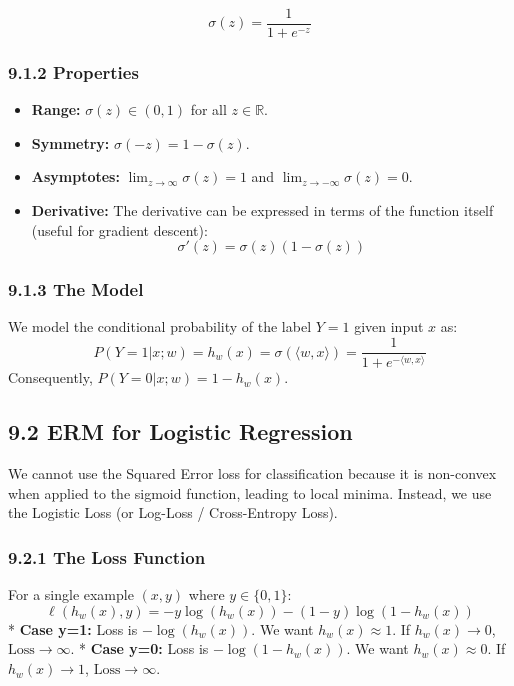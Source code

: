\documentclass[
  italian,
  11pt,
]{article}
\providecommand{\tightlist}{%
  \setlength{\itemsep}{0pt}\setlength{\parskip}{0pt}}
\begin{document}
\[\sigma(z) = \frac{1}{1 + e^{-z}}\]

\subsubsection{9.1.2 Properties}\label{properties}

\begin{itemize}
\tightlist
\item
  \textbf{Range:} \(\sigma(z) \in (0, 1)\) for all \(z \in \mathbb{R}\).
\item
  \textbf{Symmetry:} \(\sigma(-z) = 1 - \sigma(z)\).
\item
  \textbf{Asymptotes:} \(\lim_{z \to \infty} \sigma(z) = 1\) and
  \(\lim_{z \to -\infty} \sigma(z) = 0\).
\item
  \textbf{Derivative:} The derivative can be expressed in terms of the
  function itself (useful for gradient descent):
  \[\sigma'(z) = \sigma(z)(1 - \sigma(z))\]
\end{itemize}

\subsubsection{9.1.3 The Model}\label{the-model}

We model the conditional probability of the label \(Y=1\) given input
\(x\) as:
\[P(Y=1 | x; w) = h_w(x) = \sigma(\langle w, x \rangle) = \frac{1}{1 + e^{-\langle w, x \rangle}}\]
Consequently, \(P(Y=0 | x; w) = 1 - h_w(x)\).

\subsection{9.2 ERM for Logistic
Regression}\label{erm-for-logistic-regression}

We cannot use the Squared Error loss for classification because it is
non-convex when applied to the sigmoid function, leading to local
minima. Instead, we use the Logistic Loss (or Log-Loss / Cross-Entropy
Loss).

\subsubsection{9.2.1 The Loss Function}\label{the-loss-function}

For a single example \((x, y)\) where \(y \in \{0, 1\}\):
\[\ell(h_w(x), y) = -y \log(h_w(x)) - (1-y) \log(1 - h_w(x))\] *
\textbf{Case y=1:} Loss is \(-\log(h_w(x))\). We want
\(h_w(x) \approx 1\). If \(h_w(x) \to 0\), \(\text{Loss} \to \infty\). *
\textbf{Case y=0:} Loss is \(-\log(1 - h_w(x))\). We want
\(h_w(x) \approx 0\). If \(h_w(x) \to 1\), \(\text{Loss} \to \infty\).
\end{document}
